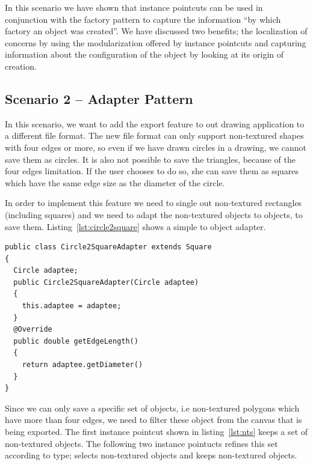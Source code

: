 In this scenario we have shown that instance pointcuts can be used in conjunction with the factory pattern to capture the information ``by which factory an object was created''.
We have discussed two benefits; the localization of concerns by using the modularization offered by instance pointcuts and capturing information about the configuration of the object by looking at its origin of creation.


\subsection{Scenario 2 -- Adapter Pattern}

In this scenario, we want to add the export feature to out drawing application to a different file format.
The new file format can only support non-textured shapes with four edges or more, so even if we have drawn circles in a drawing, we cannot save them as circles.
It is also not possible to save the triangles, because of the four edges limitation. 
If the user chooses to do so, she can save them as squares which have the same edge size as the diameter of the circle.


In order to implement this feature we need to single out non-textured rectangles (including squares) and we need to adapt the non-textured  objects to  objects, to save them.
Listing~\ref{lst:circle2square} shows a simple  to  object adapter.

\begin{lstlisting}[float, label={lst:circle2square}, caption={An adapter for creating a \lstinln{Square} object by wrapping a \lstinln{Cicle} object}]
public class Circle2SquareAdapter extends Square
{
  Circle adaptee;
  public Circle2SquareAdapter(Circle adaptee)
  {
    this.adaptee = adaptee;
  }
  @Override
  public double getEdgeLength()
  {
    return adaptee.getDiameter()
  }
}
\end{lstlisting}


Since we can only save a specific set of objects, i.e non-textured polygons which have more than four edges, we need to filter these object from the canvas that is being exported.
The first instance pointcut shown in listing~\ref{lst:nts} keeps a set of non-textured objects.
The following two instance pointucts refines this set according to type;  selects non-textured  objects and  keeps non-textured  objects.


